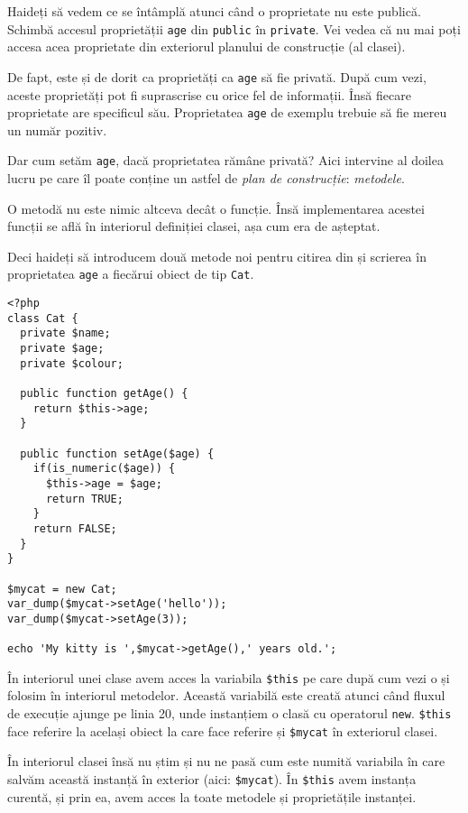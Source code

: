 
Haideți să vedem ce se întâmplă atunci când o proprietate nu este publică.
Schimbă accesul proprietății \texttt{age} din \texttt{public}
în \texttt{private}. Vei vedea că nu mai poți accesa acea proprietate din exteriorul planului
de construcție (al clasei).

De fapt, este și de dorit ca proprietăți ca \texttt{age} să fie privată. După cum vezi,
aceste proprietăți pot fi suprascrise cu orice fel de informații. Însă fiecare proprietate
are specificul său. Proprietatea \texttt{age} de exemplu trebuie să fie mereu un număr pozitiv.

Dar cum setăm \texttt{age}, dacă proprietatea rămâne privată? Aici intervine al doilea lucru
pe care îl poate conține un astfel de \textit{plan de construcție}: \textsl{metodele}.

O metodă nu este nimic altceva decât o funcție. Însă implementarea acestei funcții se află
în interiorul definiției clasei, așa cum era de așteptat.

Deci haideți să introducem două metode noi pentru citirea din și scrierea în proprietatea
\texttt{age} a fiecărui obiect de tip \texttt{Cat}.

\begin{lstlisting}[title=Getters and Setters]
<?php
class Cat {
  private $name;
  private $age;
  private $colour;

  public function getAge() {
    return $this->age;
  }

  public function setAge($age) {
    if(is_numeric($age)) {
      $this->age = $age;
      return TRUE;
    }
    return FALSE;
  }
}

$mycat = new Cat;
var_dump($mycat->setAge('hello'));
var_dump($mycat->setAge(3));

echo 'My kitty is ',$mycat->getAge(),' years old.';
\end{lstlisting}

În interiorul unei clase avem acces la variabila \texttt{\$this} pe care
după cum vezi o și folosim în interiorul metodelor. Această variabilă
este creată atunci când fluxul de execuție ajunge pe linia 20, unde instanțiem
o clasă cu operatorul \texttt{new}. \texttt{\$this} face referire la același obiect la care face
referire și \texttt{\$mycat} în exteriorul clasei.

În interiorul clasei însă nu știm și nu ne pasă cum este numită variabila
în care salvăm această instanță în exterior (aici: \texttt{\$mycat}).
În \texttt{\$this} avem instanța curentă,
și prin ea, avem acces la toate metodele și proprietățile instanței.

